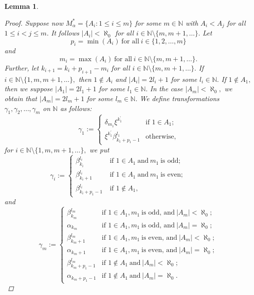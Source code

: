 \documentclass[11pt]{article}
\theoremstyle{plain}
\newtheorem{lemma}[theorem]{Lemma}
\theoremstyle{definition}
\begin{document}
\begin{lemma}
\begin{proof}
\noindent Suppose now $M_{\alpha}^{*}=\{A_{i}:1\leq i\leq m\}$ for some $m\in\mathbb{N}$ with $A_{i}< A_{j}$ for all $1\leq i<j\leq m.$ It follows $\left\vert A_{i}\right\vert<\aleph_{0}$ for all $i\in\mathbb{N}\setminus\{m,m+1,\ldots\}.$ Let 
$$p_{i}=\min(A_{i})~\text{for all}~i\in\{1,2,\ldots,m\}$$
and
$$m_{i}=\max(A_{i})~\text{for all}~i\in\mathbb{N}\setminus\{m,m+1,\ldots\}.$$ 
Further, let $k_{i+1}=k_{i}+p_{i+1}-m_{i}$ for all $i\in\mathbb{N}\setminus\{m,m+1,\ldots\}.$ If $i\in\mathbb{N}\setminus\{1,m,m+1,\ldots\},$ then $1\not\in A_{i}$ and $\left\vert A_{i}\right\vert=2l_{i}+1$ for some $l_{i}\in\mathbb{N}.$ If $1\not\in A_{1},$ then we suppose $\left\vert A_{1}\right\vert=2l_{1}+1$ for some $l_{1}\in\mathbb{N}.$ In the case $\left\vert A_{m}\right\vert<\aleph_{0},$ we obtain that $\left\vert A_{m}\right\vert=2l_{m}+1$ for some $l_{m}\in\mathbb{N}.$ We define transformations $\gamma_{1},\gamma_{2},\ldots,\gamma_{m}$ on $\mathbb{N}$ as follows:
$$\gamma_{1}:=\begin{cases}
\delta_{m_{1}}\xi^{k_{1}^{'}}~~~&\text{if }1\in A_{1};\\
\xi^{k_{1}^{'}}\beta_{k_{1}+p_{1}-1}^{l_{1}}&\text{otherwise,}
\end{cases}$$
for $i\in\mathbb{N}\setminus\{1,m,m+1,\ldots\},$ we put
$$\gamma_{i}:=\begin{cases}
\beta_{k_{i}}^{l_{i}}~~~&\text{if }1\in A_{1}~\text{and}~m_{1}~\text{is odd;}\\
\beta_{k_{i}+1}^{l_{i}}&\text{if }1\in A_{1}~\text{and}~m_{1}~\text{is even;}~~~~~~~~~~~~~~\\
\beta_{k_{i}+p_{1}-1}^{l_{i}}~&\text{if }1\not\in A_{1},
\end{cases}$$
and
$$\gamma_{m}:=\begin{cases}
\beta_{k_{m}}^{l_{m}}~~&\text{if }1\in A_{1}, m_{1}~\text{is odd, and}~\left\vert A_{m}\right\vert<\aleph_{0};\\
\alpha_{k_{m}}&\text{if }1\in A_{1}, m_{1}~\text{is odd, and}~\left\vert A_{m}\right\vert=\aleph_{0};\\
\beta_{k_{m}+1}^{l_{m}}&\text{if }1\in A_{1}, m_{1}~\text{is even, and}~\left\vert A_{m}\right\vert<\aleph_{0};\\
\alpha_{k_{m}+1}&\text{if }1\in A_{1}, m_{1}~\text{is even, and}~\left\vert A_{m}\right\vert=\aleph_{0};\\
\beta_{k_{m}+p_{1}-1}^{l_{m}}&\text{if }1\not\in A_{1}~\text{and}~\left\vert A_{m}\right\vert<\aleph_{0};\\
\alpha_{k_{m}+p_{1}-1}&\text{if }1\not\in A_{1}~\text{and}~\left\vert A_{m}\right\vert=\aleph_{0}.

\end{cases}$$
\end{proof}
\end{lemma}
\end{document}
